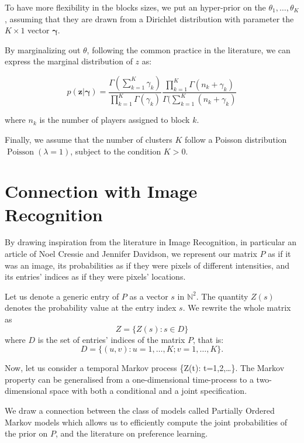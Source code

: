 \documentclass[11pt]{amsart}
\begin{document}
To have more flexibility in the blocks sizes, we put an hyper-prior on the $\theta_1, \dots, \theta_K$, assuming that they are drawn from a Dirichlet distribution with parameter the $K\times1$ vector $\boldsymbol{\gamma}$.


By marginalizing out $\theta$, following the common practice in the literature, we can express the marginal distribution of $z$ as:

\begin{equation} p(\mathbf{z}|\boldsymbol{\gamma}) = \frac{\Gamma(\sum_{k=1}^K \gamma_k)}{\prod_{k=1}^K \Gamma(\gamma_k)}\frac{\prod_{k=1}^K \Gamma(n_k+\gamma_k)}{\Gamma(\sum_{k=1}^K (n_k+\gamma_k)}
\end{equation}

where $n_k$ is the number of players assigned to block $k$.

Finally, we assume that the number of clusters $K$ follow a Poisson distribution $\operatorname{Poisson}(\lambda=1)$, subject to the condition $K>0$.

\section{Connection with Image Recognition}

By drawing inspiration from the literature in Image Recognition, in particular an article of Noel Cressie and Jennifer Davidson, we represent our matrix $P$ as if it was an image, its probabilities as if they were pixels of different intensities, and its entries' indices as if they were pixels' locations. 

Let us denote a generic entry of $P$ as a vector $s$ in $\mathbb{N}^2$. The quantity $Z(s)$ denotes the probability value at the entry index $s$. We rewrite the whole matrix as 
\begin{equation}
Z = \{Z(s): s \in D \}
\end{equation}
where $D$ is the set of entries' indices of the matrix $P$, that is:
\begin{equation}
D = \{(u,v): u = 1,\ldots,K;v=1,\ldots,K\}.
\end{equation}

Now, let us consider a temporal Markov process \{Z(t): t=1,2,\ldots\}. The Markov property can be generalised from a one-dimensional time-process to a two-dimensional space with both a conditional and a joint specification. 

We draw a connection between the class of models called Partially Ordered Markov models which allows us to efficiently compute the joint probabilities of the prior on $P$, and the literature on preference learning.
\end{document}
